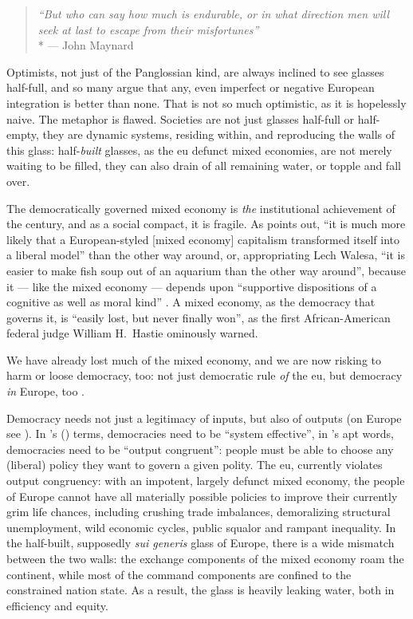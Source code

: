 \begin{quote}
	\emph{``But who can say how much is endurable, or in what direction men will seek at last to escape from their misfortunes''}
	\\*
	--- John Maynard \citet{Keynes1936}
\end{quote}

Optimists, not just of the Panglossian kind, are always inclined to see glasses half-full, and so many argue that any, even imperfect or negative European integration is better than none.
 That is not so much optimistic, as it is hopelessly naive.
The metaphor is flawed.
Societies are not just glasses half-full or half-empty, they are dynamic systems, residing within, and reproducing the walls of this glass:
half-\emph{built} glasses, as the \gls{eu} defunct mixed economies, are not merely waiting to be filled, they can also drain of all remaining water, or topple and fall over.

The democratically governed mixed economy is \emph{the} institutional achievement of the century, and as a social compact, it is fragile.
As \citeauthor{Offe2003} points out, ``it is much more likely that a European-styled [mixed economy] capitalism transformed itself into a liberal model'' than the other way around, or, appropriating Lech Walesa, ``it is easier to make fish soup out of an aquarium than the other way around'', because it --- like the mixed economy --- depends upon ``supportive dispositions of a cognitive as well as moral kind'' \citeyearpar[446]{Offe2003}.
A mixed economy, as the democracy that governs it, is ``easily lost, but never finally won'', as the first African-American federal judge William H.~Hastie ominously warned.

We have already lost much of the mixed economy, and we are now risking to harm or loose democracy, too:
not just democratic rule \emph{of} the \gls{eu}, but democracy \emph{in} Europe, too \citep[19]{Scharpf1997}.

Democracy needs not just a legitimacy of inputs, but also of outputs (on Europe see \citealt{SchaGove1999}).
In \citeauthor{Dahl-1994-ab}'s (\citeyear{Dahl-1994-ab}) terms, democracies need to be ``system effective'', in \citeauthor{Zurn-2000-aa}'s \citeyearpar{Zurn-2000-aa} apt words, democracies need to be ``output congruent'':
people must be able to choose any (liberal) policy they want to govern a given polity.
The \gls{eu}, currently violates output congruency:
with an impotent, largely defunct mixed economy, the people of Europe cannot have all materially possible policies to improve their currently grim life chances, including crushing trade imbalances, demoralizing structural unemployment, wild economic cycles, public squalor and rampant inequality.
In the half-built, supposedly \emph{sui generis} glass of Europe, there is a wide mismatch between the two walls:
the exchange components of the mixed economy roam the continent, while most of the command components are confined to the constrained nation state.
As a result, the glass is heavily leaking water, both in efficiency and equity.

